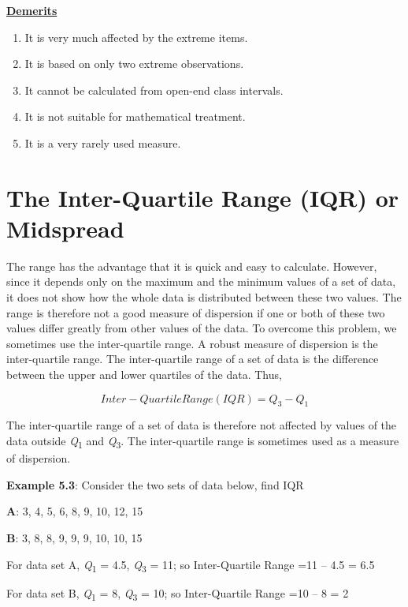 \documentclass[
]{book}
\begin{document}
\ul{\textbf{Demerits}}

\begin{enumerate}
\def\labelenumi{\arabic{enumi}.}
\item
  It is very much affected by the extreme items.
\item
  It is based on only two extreme observations.
\item
  It cannot be calculated from open-end class intervals.
\item
  It is not suitable for mathematical treatment.
\item
  It is a very rarely used measure.
\end{enumerate}

\hypertarget{the-inter-quartile-range-iqr-or-midspread}{%
\section{The Inter-Quartile Range (IQR) or Midspread}\label{the-inter-quartile-range-iqr-or-midspread}}

The range has the advantage that it is quick and easy to calculate.
However, since it depends only on the maximum and the minimum values of
a set of data, it does not show how the whole data is distributed
between these two values. The range is therefore not a good measure of
dispersion if one or both of these two values differ greatly from other
values of the data. To overcome this problem, we sometimes use the
inter-quartile range. A robust measure of dispersion is the
inter-quartile range. The inter-quartile range of a set of data is the
difference between the upper and lower quartiles of the data. Thus,

\[Inter-Quartile Range (IQR) = Q_3 - Q_1\]

The inter-quartile range of a set of data is therefore not affected by
values of the data outside \emph{Q}\textsubscript{1} and \emph{Q}\textsubscript{3}. The inter-quartile range
is sometimes used as a measure of dispersion.

\textbf{Example 5.3}: Consider the two sets of data below, find IQR

\textbf{A}: 3, 4, 5, 6, 8, 9, 10, 12, 15

\textbf{B}: 3, 8, 8, 9, 9, 9, 10, 10, 15

For data set A, \emph{Q}\textsubscript{1} = 4.5, \emph{Q}\textsubscript{3} = 11; so Inter-Quartile Range =11
-- 4.5 = 6.5

For data set B, \emph{Q}\textsubscript{1} = 8, \emph{Q}\textsubscript{3} = 10; so Inter-Quartile Range =10 --
8 = 2
\end{document}
